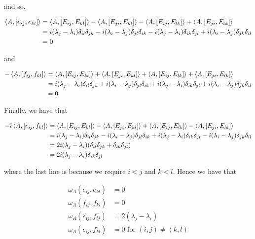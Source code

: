 \documentclass{article}
\begin{document}
and so,

\begin{align*}
    \left\langle A, [e_{ij}, e_{kl}] \right\rangle &= \left\langle A, [E_{ij}, E_{kl}] \right\rangle - \left\langle A, [E_{ji}, E_{kl}] \right\rangle - \left\langle A, [E_{ij}, E_{lk}] \right\rangle + \left\langle A, [E_{ji}, E_{lk}] \right\rangle \\
    &= i(\lambda_j - \lambda_i)\delta_{il}\delta_{jk} - i(\lambda_i - \lambda_j)\delta_{jl}\delta_{ik} - i(\lambda_j - \lambda_i)\delta_{ik}\delta_{jl} + i(\lambda_i - \lambda_j)\delta_{jk}\delta_{il} \\
    &= 0
\end{align*}

and

\begin{align*}
    -\left\langle A, [f_{ij}, f_{kl}] \right\rangle &= \left\langle A, [E_{ij}, E_{kl}] \right\rangle + \left\langle A, [E_{ji}, E_{kl}] \right\rangle + \left\langle A, [E_{ij}, E_{lk}] \right\rangle + \left\langle A, [E_{ji}, E_{lk}] \right\rangle \\
    &= i(\lambda_j - \lambda_i)\delta_{il}\delta_{jk} + i(\lambda_i - \lambda_j)\delta_{jl}\delta_{ik} + i(\lambda_j - \lambda_i)\delta_{ik}\delta_{jl} + i(\lambda_i - \lambda_j)\delta_{jk}\delta_{il} \\
    &= 0
\end{align*}

Finally, we have that

\begin{align*}
    -i\left\langle A, [e_{ij}, f_{kl}] \right\rangle &= \left\langle A, [E_{ij}, E_{kl}] \right\rangle - \left\langle A, [E_{ji}, E_{kl}] \right\rangle + \left\langle A, [E_{ij}, E_{lk}] \right\rangle - \left\langle A, [E_{ji}, E_{lk}] \right\rangle \\
    &= i(\lambda_j - \lambda_i)\delta_{il}\delta_{jk} - i(\lambda_i - \lambda_j)\delta_{jl}\delta_{ik} + i(\lambda_j - \lambda_i)\delta_{ik}\delta_{jl} - i(\lambda_i - \lambda_j)\delta_{jk}\delta_{il} \\
    &= 2i(\lambda_j - \lambda_i)(\delta_{il}\delta_{jk} + \delta_{ik}\delta_{jl}) \\
    &= 2i(\lambda_j - \lambda_i)\delta_{ik}\delta_{jl}
\end{align*}

where the last line is because we require \(i < j\) and \(k < l\). Hence we have that

\begin{align*}
    \omega_A(e_{ij}, e_{kl}) &= 0 \\
    \omega_A(f_{ij}, f_{kl}) &= 0 \\
    \omega_A(e_{ij}, f_{ij}) &= 2(\lambda_j - \lambda_i) \\
    \omega_A(e_{ij}, f_{kl}) &= 0 \text{ for }(i, j) \ne (k, l)
\end{align*}
\end{document}
